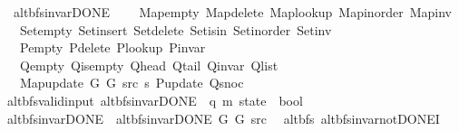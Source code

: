 \begin{isabellebody}
\ \ \ alt{\isacharunderscore}{\kern0pt}bfs{\isacharunderscore}{\kern0pt}invar{\isacharunderscore}{\kern0pt}DONE\isanewline
\ \ \ \ Map{\isacharunderscore}{\kern0pt}empty\ Map{\isacharunderscore}{\kern0pt}delete\ Map{\isacharunderscore}{\kern0pt}lookup\ Map{\isacharunderscore}{\kern0pt}inorder\ Map{\isacharunderscore}{\kern0pt}inv\isanewline
\ \ \ \ Set{\isacharunderscore}{\kern0pt}empty\ Set{\isacharunderscore}{\kern0pt}insert\ Set{\isacharunderscore}{\kern0pt}delete\ Set{\isacharunderscore}{\kern0pt}isin\ Set{\isacharunderscore}{\kern0pt}inorder\ Set{\isacharunderscore}{\kern0pt}inv\isanewline
\ \ \ \ P{\isacharunderscore}{\kern0pt}empty\ P{\isacharunderscore}{\kern0pt}delete\ P{\isacharunderscore}{\kern0pt}lookup\ P{\isacharunderscore}{\kern0pt}invar\isanewline
\ \ \ \ Q{\isacharunderscore}{\kern0pt}empty\ Q{\isacharunderscore}{\kern0pt}is{\isacharunderscore}{\kern0pt}empty\ Q{\isacharunderscore}{\kern0pt}head\ Q{\isacharunderscore}{\kern0pt}tail\ Q{\isacharunderscore}{\kern0pt}invar\ Q{\isacharunderscore}{\kern0pt}list\isanewline
\ \ \ \ Map{\isacharunderscore}{\kern0pt}update\ G{}\ G{}\ src\ s\ P{\isacharunderscore}{\kern0pt}update\ Q{\isacharunderscore}{\kern0pt}snoc{\isachardoublequoteclose}\isanewline
\isanewline
{}\isamarkupfalse%
\ {\isacharparenleft}{\kern0pt}\ alt{\isacharunderscore}{\kern0pt}bfs{\isacharunderscore}{\kern0pt}valid{\isacharunderscore}{\kern0pt}input{\isacharparenright}{\kern0pt}\ alt{\isacharunderscore}{\kern0pt}bfs{\isacharunderscore}{\kern0pt}invar{\isacharunderscore}{\kern0pt}DONE{\isacharprime}{\kern0pt}{\isacharprime}{\kern0pt}\ {\isacharcolon}{\kern0pt}{\isacharcolon}{\kern0pt}\ {\isachardoublequoteopen}{\isacharparenleft}{\kern0pt}{\isacharprime}{\kern0pt}q{\isacharcomma}{\kern0pt}\ {\isacharprime}{\kern0pt}m{\isacharparenright}{\kern0pt}\ state\ {\isasymRightarrow}\ bool{\isachardoublequoteclose}\ \isanewline
\ \ {\isachardoublequoteopen}alt{\isacharunderscore}{\kern0pt}bfs{\isacharunderscore}{\kern0pt}invar{\isacharunderscore}{\kern0pt}DONE{\isacharprime}{\kern0pt}{\isacharprime}{\kern0pt}\ {\isasymequiv}\ alt{\isacharunderscore}{\kern0pt}bfs{\isacharunderscore}{\kern0pt}invar{\isacharunderscore}{\kern0pt}DONE{\isacharprime}{\kern0pt}\ G{}\ G{}\ src{\isachardoublequoteclose}\isanewline
\isanewline
{}\isamarkupfalse%
\ {\isacharparenleft}{\kern0pt}\ alt{\isacharunderscore}{\kern0pt}bfs{\isacharparenright}{\kern0pt}\ alt{\isacharunderscore}{\kern0pt}bfs{\isacharunderscore}{\kern0pt}invar{\isacharunderscore}{\kern0pt}not{\isacharunderscore}{\kern0pt}DONE{\isacharprime}{\kern0pt}I{\isacharcolon}{\kern0pt}\isanewline

\end{isabellebody}
